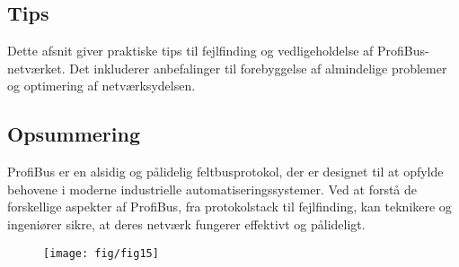 \subsection*{Tips}
Dette afsnit giver praktiske tips til fejlfinding og vedligeholdelse af ProfiBus-netværket. Det inkluderer anbefalinger til forebyggelse af almindelige problemer og optimering af netværksydelsen.

\subsection{Opsummering}
ProfiBus er en alsidig og pålidelig feltbusprotokol, der er designet til at opfylde behovene i moderne industrielle automatiseringssystemer. Ved at forstå de forskellige aspekter af ProfiBus, fra protokolstack til fejlfinding, kan teknikere og ingeniører sikre, at deres netværk fungerer effektivt og pålideligt.
\begin{figure}[!h]
	\centering
	\texttt{[image: fig/fig15]}
\end{figure}
